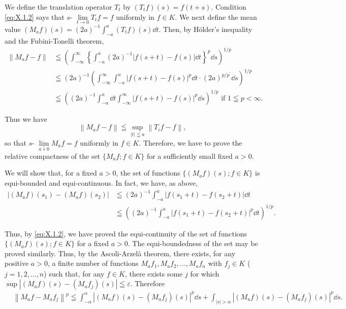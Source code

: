 \begin{theoremn} We define the translation operator $T_{t}$ by $(T_{t}f)(s) = f(t + s)$. Condition \eqref{eq:X.1.2} says that  
$s\text{- }\lim\limits_{t \to 0} T_t f = f$ uniformly in $f \in K$. We next define the mean value $(M_a f)(s) = (2a)^{-1} \int_{-a}^{a} (T_t f)(s) \dd t$. Then, by Hölder's inequality and the Fubini-Tonelli theorem, 
\[
\begin{aligned}
\left\| M _{a} f - f \right\|& \leqq \left(\int_{- \infty} ^{\infty} \left\{\int_{-a} ^{a} (2 a) ^{-1} | f (s + t) - f (s) | \dd t \right\} ^{p} \dd s\right) ^{1/p}
\\
\quad& \leqq (2 a) ^{-1} \left(\int_{- \infty} ^{\infty} \int_{-a} ^{a} | f (s + t) - f (s) | ^{p} \dd t \cdot (2 a) ^ {p / p ^{\prime}} \dd s\right) ^{1/p}
\\
\quad& \leqq \left((2 a) ^{-1} \int_{-a} ^{a} \dd t \int_{- \infty} ^{\infty} | f (s + t) - f (s) | ^{p} \dd s\right) ^{1/p} \text{ if } 1 \leqq p < \infty .
\end{aligned}
\]
\end{theoremn}

Thus we have 
\[
\left\| M _{a} f - f \right\| \leqq \sup\limits _{| t | \leqq a} \left\| T _{i} f - f \right\|,
\]
so that $s\text{- }\lim\limits_{a \downarrow 0} M_a f = f$ uniformly in $f \in K$. Therefore, we have to prove the relative compactness of the set $\{M_a f; f \in K\}$ for a sufficiently small fixed $a > 0$. 

We will show that, for a fixed $a > 0$, the set of functions $\{(M_{a}f)(s); f \in K\}$ is equi-bounded and equi-continuous. In fact, we have, as above, 
\[
\begin{aligned} \left| (M _{a} f) (s _{1}) - (M _{a} f) (s _{2}) \right| & \leqq (2 a) ^{-1} \int_{-a} ^{a} | f (s _{1} + t) - f (s _{2} + t) | \dd t \\ & \leqq \left((2 a) ^{-1} \int_{-a} ^{a} | f (s _{1} + t) - f (s _{2} + t) | ^{p} \dd t\right) ^{1/p}. \end{aligned}
\]

Thus, by \eqref{eq:X.1.2}, we have proved the equi-continuity of the set of functions $\{(M_{a}f)(s); f \in K\}$ for a fixed $a > 0$. The equi-boundedness of the set may be proved similarly. Thus, by the Ascoli-Arzelà theorem, there exists, for any positive $a > 0$, a finite number of functions $M_{a}f_{1}, M_{a}f_{2}, \ldots, M_{a}f_{n}$ with $f_{j} \in K$ ( $j = 1, 2, \ldots, n$) such that, for any $f \in K$, there exists some $j$ for which $\sup |(M_{a}f)(s) - (M_{a}f_{j})(s)| \leqq \varepsilon$. Therefore 
\begin{equation}\label{eq:X.1.4}
\begin{aligned}
&\left\| M _{a} f - M _{a} f _{j} \right\| ^{p}  \leqq \int_{- \alpha} ^{\alpha} | (M _{a} f) (s) - (M _{a} f _{j}) (s) | ^{p} \dd s + \int_{| s | > \alpha} | (M _{a} f) (s) - (M _{a} f _{j}) (s) | ^{p} \dd s.
\end{aligned}
\end{equation}

